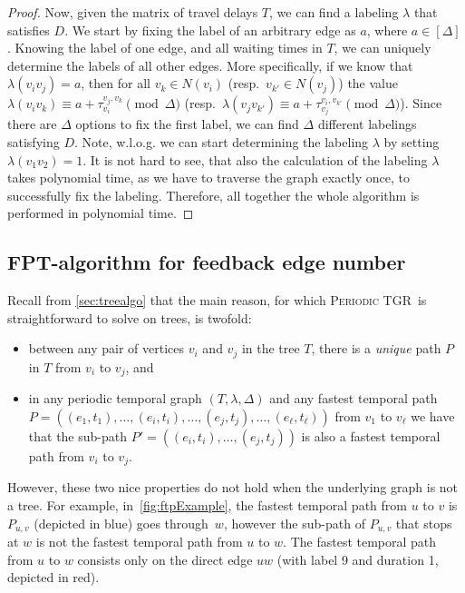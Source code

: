 \documentclass[a4paper,UKenglish,cleveref, autoref, thm-restate, anonymous]{lipics-v2021}
\newcommand{\deltaExact}{\textsc{Periodic TGR}}
\begin{document}
\begin{proof}
    Now, given the matrix of travel delays $T$, we can find a labeling $\lambda$ that satisfies $D$.
    We start by fixing the label of an arbitrary edge as $a$, where $a \in [\Delta]$.
    Knowing the label of one edge, and all waiting times in $T$, we can uniquely determine the labels of all other edges.
    More specifically, if we know that $\lambda(v_i v_j) = a$, then for all $v_k \in N(v_i)$ (resp.~$v_{k'} \in N(v_j)$)
    the value $\lambda(v_iv_k) \equiv a + \tau_{v_i}^{v_j,v_k} \pmod \Delta $ (resp.~$\lambda(v_j v_{k'}) \equiv a + \tau_{v_j}^{v_i,v_{k'}} \pmod \Delta $).
    Since there are $\Delta$ options to fix the first label, we can find $\Delta$ different labelings satisfying $D$.
    Note, w.l.o.g. we can start determining the labeling $\lambda$ by setting $\lambda(v_1v_2) = 1$.
    It is not hard to see, that also the calculation of the labeling $\lambda$ takes polynomial time, as we have to traverse the graph exactly once, to successfully fix the labeling. Therefore, all together the whole algorithm is performed in polynomial time.
\end{proof}






\subsection{FPT-algorithm for feedback edge number}\label{sec:FPT}

Recall from \cref{sec:treealgo} that the main reason, for which \deltaExact\ is straightforward to solve on trees, is twofold: 
\begin{itemize}
    \item between any pair of vertices $v_i$ and $v_j$ in the tree $T$, there is a \emph{unique} path $P$ in $T$ from $v_i$ to $v_j$, and 
    \item in any periodic temporal graph $(T,\lambda,\Delta)$ and any fastest temporal path $P=((e_1,t_1),\ldots,(e_i,t_i),\ldots,(e_j,t_j),\ldots,(e_\ell,t_\ell))$ from $v_1$ to $v_{\ell}$ we have that the sub-path $P'=((e_i,t_i),\ldots,(e_j,t_j))$ is also a fastest temporal path from $v_i$ to $v_j$.
\end{itemize}
However, these two nice properties do not hold when the underlying graph is not a tree. For example, in~\cref{fig:ftpExample}, the fastest temporal path from $u$ to $v$ is $P_{u,v}$ (depicted in blue) goes through~$w$, however the sub-path of $P_{u,v}$ that stops at $w$ is not the fastest temporal path from $u$ to $w$. The fastest temporal path from $u$ to $w$ consists only on the direct edge $uw$ (with label 9 and duration 1, depicted in red).
\end{document}
